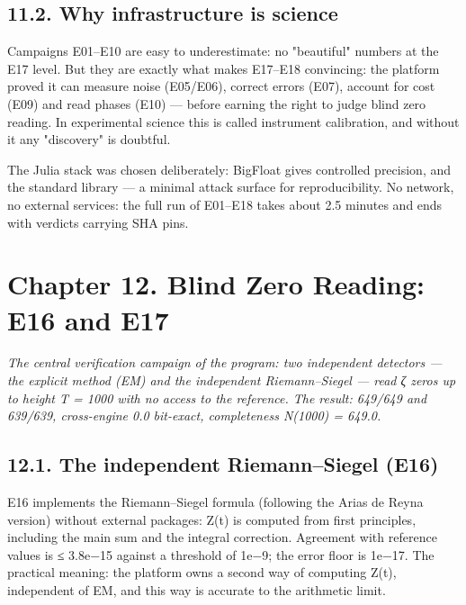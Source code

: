 \documentclass[11pt,a4paper]{article}
\begin{document}
\subsection{11.2. Why infrastructure is science}

Campaigns E01–E10 are easy to underestimate: no "beautiful" numbers at the E17 level. But they are exactly what makes E17–E18 convincing: the platform proved it can measure noise (E05/E06), correct errors (E07), account for cost (E09) and read phases (E10) — before earning the right to judge blind zero reading. In experimental science this is called instrument calibration, and without it any "discovery" is doubtful.

The Julia stack was chosen deliberately: BigFloat gives controlled precision, and the standard library — a minimal attack surface for reproducibility. No network, no external services: the full run of E01–E18 takes about 2.5 minutes and ends with verdicts carrying SHA pins.

\section{Chapter 12. Blind Zero Reading: E16 and E17}

\noindent\textit{\color{copper}The central verification campaign of the program: two independent detectors — the explicit method (EM) and the independent Riemann–Siegel — read ζ zeros up to height T = 1000 with no access to the reference. The result: 649/649 and 639/639, cross-engine 0.0 bit-exact, completeness N(1000) = 649.0.}

\subsection{12.1. The independent Riemann–Siegel (E16)}

E16 implements the Riemann–Siegel formula (following the Arias de Reyna version) without external packages: Z(t) is computed from first principles, including the main sum and the integral correction. Agreement with reference values is ≤ 3.8e−15 against a threshold of 1e−9; the error floor is 1e−17. The practical meaning: the platform owns a second way of computing Z(t), independent of EM, and this way is accurate to the arithmetic limit.

\begin{center}\end{center}
\end{document}
